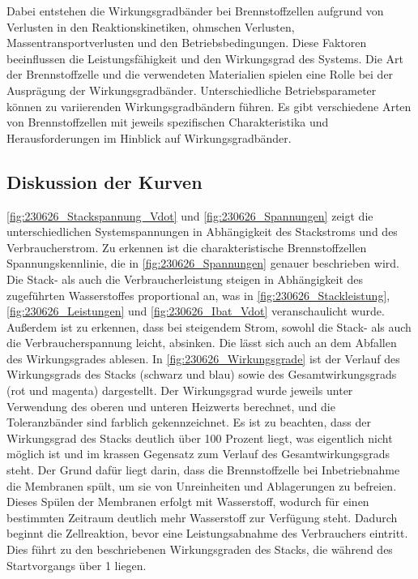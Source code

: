 Dabei entstehen die Wirkungsgradbänder bei Brennstoffzellen aufgrund von Verlusten in den Reaktionskinetiken, 
ohmschen Verlusten, Massentransportverlusten und den Betriebsbedingungen. 
Diese Faktoren beeinflussen die Leistungsfähigkeit und den Wirkungsgrad des Systems.
Die Art der Brennstoffzelle und die verwendeten Materialien spielen eine Rolle bei der Ausprägung der Wirkungsgradbänder. 
Unterschiedliche Betriebsparameter können zu variierenden Wirkungsgradbändern führen. 
Es gibt verschiedene Arten von Brennstoffzellen mit jeweils spezifischen Charakteristika und Herausforderungen im Hinblick auf Wirkungsgradbänder.


\subsection{Diskussion der Kurven}

\autoref{fig:230626_Stackspannung_Vdot} und \autoref{fig:230626_Spannungen} zeigt die unterschiedlichen Systemspannungen in Abhängigkeit des Stackstroms und des Verbraucherstrom. 
Zu erkennen ist die charakteristische Brennstoffzellen Spannungskennlinie, die in \autoref{fig:230626_Spannungen} genauer beschrieben wird. 
Die Stack- als auch die Verbraucherleistung steigen in Abhängigkeit des zugeführten Wasserstoffes proportional an, was in \autoref{fig:230626_Stackleistung}, \ref{fig:230626_Leistungen} und \ref{fig:230626_Ibat_Vdot} veranschaulicht wurde. 
Außerdem ist zu erkennen, dass bei steigendem Strom, sowohl die Stack- als auch die Verbraucherspannung leicht, absinken. Die lässt sich auch an dem Abfallen des Wirkungsgrades ablesen. 
In \autoref{fig:230626_Wirkungsgrade} ist der Verlauf des Wirkungsgrads des Stacks (schwarz und blau) sowie des Gesamtwirkungsgrads (rot und magenta) dargestellt. 
Der Wirkungsgrad wurde jeweils unter Verwendung des oberen und unteren Heizwerts berechnet, und die Toleranzbänder sind farblich gekennzeichnet. 
Es ist zu beachten, dass der Wirkungsgrad des Stacks deutlich über 100 Prozent liegt, was eigentlich nicht möglich ist und im krassen Gegensatz zum Verlauf des Gesamtwirkungsgrads steht.
Der Grund dafür liegt darin, dass die Brennstoffzelle bei Inbetriebnahme die Membranen spült, um sie von Unreinheiten und Ablagerungen zu befreien. 
Dieses Spülen der Membranen erfolgt mit Wasserstoff, wodurch für einen bestimmten Zeitraum deutlich mehr Wasserstoff zur Verfügung steht. 
Dadurch beginnt die Zellreaktion, bevor eine Leistungsabnahme des Verbrauchers eintritt. Dies führt zu den beschriebenen Wirkungsgraden des Stacks, die während des Startvorgangs über 1 liegen.


